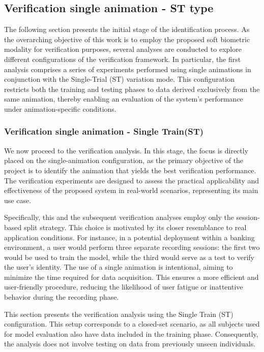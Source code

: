 \documentclass{article}
\begin{document}
\subsection{Verification single animation - ST type}
\label{subsec:prima_ver}

The following section presents the initial stage of the identification process.
As the overarching objective of this work is to employ the proposed soft biometric modality for verification purposes, several analyses are conducted to explore different configurations of the verification framework.
In particular, the first analysis comprises a series of experiments performed using single animations in conjunction with the Single-Trial (ST) variation mode.
This configuration restricts both the training and testing phases to data derived exclusively from the same animation, thereby enabling an evaluation of the system's performance under animation-specific conditions.

\subsubsection{Verification single animation - Single Train(ST)}
\label{subsec:vs_st}

We now proceed to the verification analysis.
In this stage, the focus is directly placed on the single-animation configuration, as the primary objective of the project is to identify the animation that yields the best verification performance.
The verification experiments are designed to assess the practical applicability and effectiveness of the proposed system in real-world scenarios, representing its main use case.

Specifically, this and the subsequent verification analyses employ only the session-based split strategy.
This choice is motivated by its closer resemblance to real application conditions.
For instance, in a potential deployment within a banking environment, a user would perform three separate recording sessions: the first two would be used to train the model, while the third would serve as a test to verify the user's identity.
The use of a single animation is intentional, aiming to minimize the time required for data acquisition.
This ensures a more efficient and user-friendly procedure, reducing the likelihood of user fatigue or inattentive behavior during the recording phase.

This section presents the verification analysis using the Single Train (ST) configuration.
This setup corresponds to a closed-set scenario, as all subjects used for model evaluation also have data included in the training phase.
Consequently, the analysis does not involve testing on data from previously unseen individuals.
\end{document}

